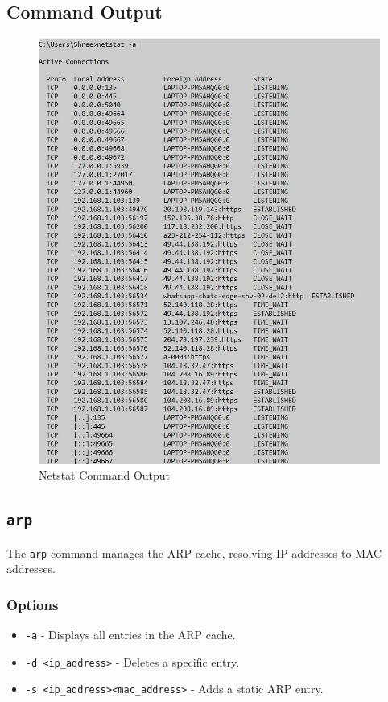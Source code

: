 \documentclass{article}
\begin{document}
\subsection{Command Output}
\begin{figure}[htbp]
    \centering
    \includegraphics[]{netstat-aCom.jpeg}
    \caption{Netstat Command Output}
    \label{fig:netstat_output}
\end{figure}
\clearpage  %
\subsection{\texttt{arp}}
The \texttt{arp} command manages the ARP cache, resolving IP addresses to MAC addresses.

\subsubsection{Options}
\begin{itemize}
    \item \texttt{-a} - Displays all entries in the ARP cache.
    \item \texttt{-d \textless ip\_address\textgreater} - Deletes a specific entry.
    \item \texttt{-s \textless ip\_address\textgreater \textless mac\_address\textgreater} - Adds a static ARP entry.
\end{itemize}
\end{document}
